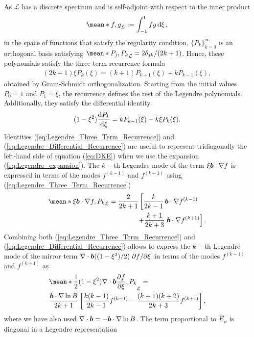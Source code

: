 \documentclass[10pt]{iopart}
\newcommand{\Lorentz}{\mathcal{L}}
\begin{document}
As $\Lorentz$ has a discrete spectrum and is self-adjoint with respect to the inner product
%
\begin{align}
	\mean*{f,g}_\Lorentz := \int_{-1}^{1} fg \dd{\xi} ,
\end{align}
in the space of functions that satisfy the regularity condition, $\{P_k\}_{k=0}^{\infty}$ is an orthogonal basis satisfying $\mean*{P_j,P_k}_\Lorentz = 2 \delta_{jk}/(2k+1)$. Hence, these polynomials satisfy the three-term recurrence formula
%
\begin{align}
	(2k+1)\xi P_k(\xi) = (k+1)P_{k+1}(\xi) + k P_{k-1}(\xi),
	\label{eq:Legendre_Three_Term_Recurrence}
\end{align}
obtained by Gram-Schmidt orthogonalization. Starting from the initial values $P_0=1$ and $P_1=\xi$, the recurrence defines the rest of the Legendre polynomials. Additionally, they satisfy the differential identity
%
\begin{align}
	(1-\xi^2)\dv{P_k}{\xi} = k P_{k-1}(\xi) - k \xi P_k(\xi).
	\label{eq:Legendre_Differential_Recurrence}
\end{align}
%
Identities (\ref{eq:Legendre_Three_Term_Recurrence}) and (\ref{eq:Legendre_Differential_Recurrence}) are useful to represent tridiagonally the left-hand side of equation (\ref{eq:DKE}) when we use the expansion (\ref{eq:Legendre_expansion}). The $k-$th Legendre mode of the term $\xi\vb*{b}\cdot \nabla f $ is expressed in terms of the modes $f^{(k-1)}$ and $f^{(k+1)}$ using (\ref{eq:Legendre_Three_Term_Recurrence})
\begin{align}	
	\mean*{\xi \vb*{b}\cdot\nabla f, P_k}_\Lorentz
	=
	\frac{2}{2k+1}
	\left[
	\frac{k}{2k-1} 
	\right.
	& \vb*{b}\cdot\nabla f^{(k-1)} \nonumber
	\\+
	\frac{k+1}{2k+3} 
	& 
	\left.\vb*{b}\cdot\nabla f^{(k+1)} 
	\right].
\end{align}
Combining both (\ref{eq:Legendre_Three_Term_Recurrence}) and (\ref{eq:Legendre_Differential_Recurrence}) allows to express the $k-$th Legendre mode of the mirror term $\nabla\cdot \vb*{b}((1-\xi^2)/2)\pdv*{f}{\xi}$ in terms of the modes $f^{(k-1)}$ and $f^{(k+1)}$ as
\begin{align} 	
	& \mean*{ 
		\frac{1}{2}(1-\xi^2)
		\nabla\cdot\vb*{b}  
		\pdv{f}{\xi}, P_k}_\Lorentz
	=	\\
	&\frac{\vb*{b}\cdot\nabla \ln B}{2k+1}
	\left[
	\frac{k(k-1)}{2k-1} 
	f^{(k-1)} 
	-
	\frac{(k+1)(k+2)}{2k+3}
	f^{(k+1)} 
	\right], \nonumber
\end{align}
where we have also used $\nabla\cdot\vb*{b}  = - \vb*{b}\cdot \nabla \ln B$. The term proportional to $\widehat{E}_\psi$ is diagonal in a Legendre representation
\end{document}
